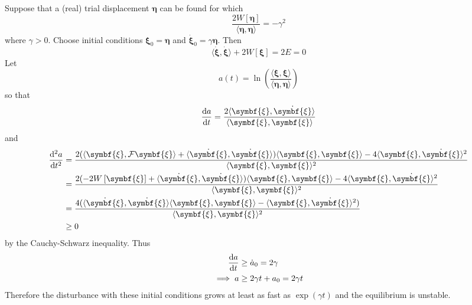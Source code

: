 \documentclass{jknotes}
\newcommand{\disp}{\symbf{\xi}}
\begin{document}
Suppose that a (real) trial displacement $\symbf{\eta}$ can be found for which
\begin{equation}
	\frac{2W\left[\symbf{\eta}\right]}{\langle \symbf{\eta},
	\symbf{\eta}\rangle} = -\gamma^2
\end{equation}
where $\gamma >0$. Choose initial conditions $\disp_0 = \symbf{\eta}$ and
$\dot{\disp}_0 = \gamma \symbf{\eta}$. Then
\begin{equation}
	\langle \dot{\disp},\dot{\disp}\rangle + 2W\left[\disp\right] = 2E = 0
\end{equation}
Let
\begin{equation}
	a(t) = \ln \left( \frac{\langle \disp, \disp \rangle}{\langle
	\symbf{\eta}, \symbf{\eta}\rangle}\right)
\end{equation}
so that
\begin{equation}
	\frac{\diffd a}{\diffd t} = \frac{2\langle \disp,
	\dot{\disp}\rangle}{\langle \disp, \disp \rangle}
\end{equation}
and
\begin{align}
	\frac{\diffd^2 a}{\diffd t^2}
	&= \frac{2(\langle \disp,
		\mathcal{F}\disp\rangle + \langle
		\dot{\disp},\dot{\disp}\rangle)\langle\disp,\disp\rangle -
	4\langle\disp,\dot{\disp}\rangle^2}{\langle \disp, \disp \rangle^2} \\
	&= \frac{2(-2W\left[\disp\right]+ \langle
		\dot{\disp},\dot{\disp}\rangle)\langle\disp,\disp\rangle -
	4\langle\disp,\dot{\disp}\rangle^2}{\langle \disp, \disp \rangle^2} \\
	&= \frac{4(\langle
		\dot{\disp},\dot{\disp}\rangle\langle\disp,\disp\rangle -
	\langle\disp,\dot{\disp}\rangle^2)}{\langle \disp, \disp \rangle^2} \\
	&\ge 0
\end{align}
by the Cauchy-Schwarz inequality. Thus 
\begin{align}
	\frac{\diffd a}{\diffd t} &\ge \dot{a}_0 = 2\gamma \\
	\implies a &\ge 2\gamma t + a_0 = 2 \gamma t
\end{align}
Therefore the disturbance with these initial conditions grows at least as fast
as $\exp(\gamma t)$ and the equilibrium is unstable.
\end{document}
